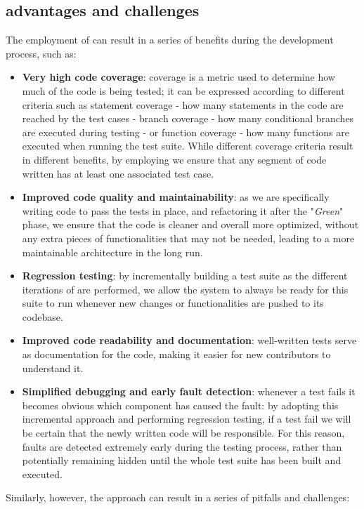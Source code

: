 \subsection{\tdd advantages and challenges}
The employment of \tdd can result in a series of benefits during the development process, such as:
\begin{itemize}
    \item \textbf{Very high code coverage}: coverage is a metric used to determine how much of the code is being tested; it can be expressed according to different criteria such as statement coverage - \ie how many statements in the code are reached by the test cases - branch coverage - \ie how many conditional branches are executed during testing - or function coverage - \ie how many functions are executed when running the test suite. While different coverage criteria result in different benefits, by employing \tdd we ensure that any segment of code written has at least one associated test case.
    \item \textbf{Improved code quality and maintainability}: as we are specifically writing code to pass the tests in place, and refactoring it after the "\textit{Green}" phase, we ensure that the code is cleaner and overall more optimized, without any extra pieces of functionalities that may not be needed, leading to a more maintainable architecture in the long run.
    \item \textbf{Regression testing}: by incrementally building a test suite as the different iterations of \tdd are performed, we allow the system to always be ready for this suite to run whenever new changes or functionalities are pushed to its codebase.
    \item \textbf{Improved code readability and documentation}: well-written tests serve as documentation for the code, making it easier for new contributors to understand it.
    \item \textbf{Simplified debugging and early fault detection}: whenever a test fails it becomes obvious which component has caused the fault: by adopting this incremental approach and performing regression testing, if a test fail we will be certain that the newly written code will be responsible. For this reason, faults are detected extremely early during the testing process, rather than potentially remaining hidden until the whole test suite has been built and executed.
\end{itemize}
Similarly, however, the \tdd approach can result in a series of pitfalls and challenges:

